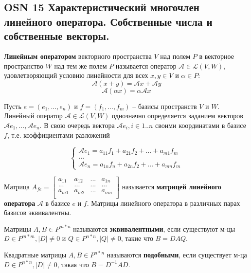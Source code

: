 \subsection*{OSN 15 Характеристический многочлен линейного оператора. Собственные числа и собственные векторы.}

\textbf{Линейным оператором} векторного пространства $V$ над полем $P$ в векторное пространство $W$ над тем же полем $P$ называется оператор $\mathcal{A} \in \mathcal{L}(V, W)$, удовлетворяющий условию линейности для всех $x, y \in V$ и $\alpha \in P$:
$$\mathcal{A} (x+y) = \mathcal{A} x + \mathcal{A} y$$
$$\mathcal{A} (\alpha x) = \alpha \mathcal{A} x$$

Пусть $e = (e_1, ..., e_n)$ и $f = (f_1, ..., f_m)$ -- базисы пространств $V$ и $W$. Линейный оператор $\mathcal{A} \in \mathcal{L}(V, W)$ однозначно определяется заданием векторов $\mathcal{A} e_1, ..., \mathcal{A} e_n$. В свою очередь вектора $\mathcal{A} e_i, i \in 1..n$ своими координатами в базисе $f$, т.е. коэффициентами разложений

$$\begin{cases} 
 \mathcal{A} e_1 = a_{11} f_1 + a_{21} f_2 + ... + a_{m1} f_m \\
 ... \\
 \mathcal{A} e_n = a_{1n} f_n + a_{2n} f_2 + ... + a_{mn} f_m
\end{cases}$$

Матрица $A_{fe} = 
\begin{bmatrix}
a_{11} & a_{12} & ... & a_{1n} \\
... & ... & ... & ... \\
a_{m1} & a_{m2} & ... & a_{mn} \\
\end{bmatrix}$
называется \textbf{матрицей линейного оператора} $\mathcal{A}$ в базисе $e$ и $f$. Матрицы линейного оператора в различных парах базисов эквивалентны.

Матрицы $A, B \in P^{m*n}$ называются \textbf{эквивалентными}, если существуют м-цы $D \in P^{m*m}, |D| \neq 0$ и $Q \in P^{n*n}, |Q| \neq 0$, такие что $B = D A Q$.

Квадратные матрицы $A, B \in P^{n*n}$ называются \textbf{подобными}, если существует м-ца $D \in P^{n*n}, |D| \neq 0$, такая что $B = D^{-1} A D$.


